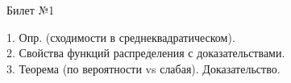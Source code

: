 \documentclass[preview]{standalone}
\begin{document}
 
\begin{center} {\Large Билет №1} \end{center} 

1.  Опр. (сходимости в среднеквадратическом).\\

2.  Свойства функций распределения с доказательствами.\\

3.  Теорема (по вероятности vs слабая). Доказательство. \\ \\
\end{document}
